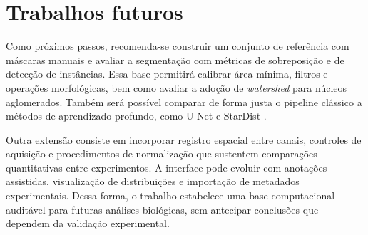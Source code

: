 \section{Trabalhos futuros}

Como próximos passos, recomenda-se construir um conjunto de referência com máscaras manuais e avaliar a segmentação com métricas de sobreposição e de detecção de instâncias. Essa base permitirá calibrar área mínima, filtros e operações morfológicas, bem como avaliar a adoção de \textit{watershed} para núcleos aglomerados. Também será possível comparar de forma justa o pipeline clássico a métodos de aprendizado profundo, como U-Net \cite{Ronneberger2015} e StarDist \cite{Schmidt2018}.

Outra extensão consiste em incorporar registro espacial entre canais, controles de aquisição e procedimentos de normalização que sustentem comparações quantitativas entre experimentos. A interface pode evoluir com anotações assistidas, visualização de distribuições e importação de metadados experimentais. Dessa forma, o trabalho estabelece uma base computacional auditável para futuras análises biológicas, sem antecipar conclusões que dependem da validação experimental.
